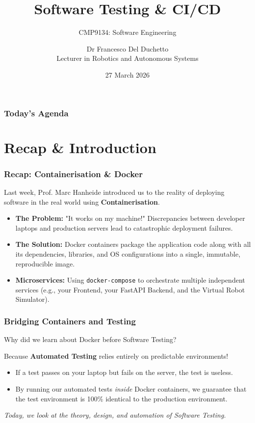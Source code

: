 \documentclass[xcolor=table]{beamer}
\title[CMP9134 - Week 8]{Software Testing \& CI/CD}
\subtitle{CMP9134: Software Engineering}
\author[Francesco Del Duchetto]{Dr Francesco Del Duchetto\\Lecturer in Robotics and Autonomous Systems}
\institute[University of Lincoln]{University of Lincoln}
\date{27 March 2026}
\begin{document}
\begin{frame}
    \titlepage
\end{frame}

\begin{frame}
    \frametitle{Today's Agenda}
    \tableofcontents
\end{frame}

\section{Recap \& Introduction}

\begin{frame}
    \frametitle{Recap: Containerisation \& Docker}
    Last week, Prof. Marc Hanheide introduced us to the reality of deploying software in the real world using \textbf{Containerisation}.
    
    \begin{itemize}
        \item \textbf{The Problem:} "It works on my machine!" Discrepancies between developer laptops and production servers lead to catastrophic deployment failures.
        \item \textbf{The Solution:} Docker containers package the application code along with all its dependencies, libraries, and OS configurations into a single, immutable, reproducible image.
        \item \textbf{Microservices:} Using \texttt{docker-compose} to orchestrate multiple independent services (e.g., your Frontend, your FastAPI Backend, and the Virtual Robot Simulator).
    \end{itemize}
\end{frame}

\begin{frame}
    \frametitle{Bridging Containers and Testing}
    Why did we learn about Docker before Software Testing?
    
    \vspace{0.3cm}
    Because \textbf{Automated Testing} relies entirely on predictable environments! 
    \begin{itemize}
        \item If a test passes on your laptop but fails on the server, the test is useless.
        \item By running our automated tests \textit{inside} Docker containers, we guarantee that the test environment is 100\% identical to the production environment.
    \end{itemize}
    
    \vspace{0.2cm}
    \textit{Today, we look at the theory, design, and automation of Software Testing.}
\end{frame}
\end{document}
